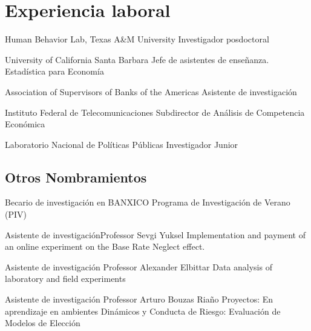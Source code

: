 \section{Experiencia laboral}

{Human Behavior Lab, Texas A\&M University}
{Investigador posdoctoral}{}{}{}

{University of California Santa Barbara}
{Jefe de asistentes de enseñanza. Estadística para Economía}
{}{}{}

{Association of Supervisors of Banks of the Americas}
{Asistente de investigación}{}{}{}

{Instituto Federal de Telecomunicaciones}
{Subdirector de Análisis de Competencia Económica}
{}{}{}

{Laboratorio Nacional de Políticas Públicas}
{Investigador Junior}
{}{}{}

\subsection{Otros Nombramientos}

{Becario de investigación en BANXICO}
{}{}
{Programa de Investigación de Verano (PIV)}

{Asistente de investigación}{Professor Sevgi Yuksel}
{}
{Implementation and payment of an online experiment on the Base Rate Neglect effect.}

{Asistente de investigación}
{Professor Alexander Elbittar}
{}
{Data analysis of  laboratory and field experiments}

{Asistente de investigación}
{Professor Arturo Bouzas Riaño}
{}
{Proyectos: En aprendizaje en ambientes Dinámicos y Conducta de Riesgo: Evaluación de Modelos de Elección}{}{}{}

%

%
	 
	 